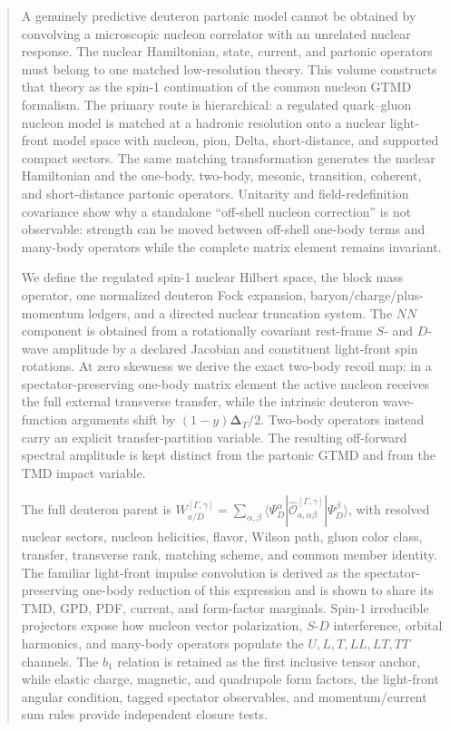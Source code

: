 \documentclass[11pt]{article}
\begin{document}
\begin{abstract}
A genuinely predictive deuteron partonic model cannot be obtained by
convolving a microscopic nucleon correlator with an unrelated nuclear
response.  The nuclear Hamiltonian, state, current, and partonic operators
must belong to one matched low-resolution theory.  This volume constructs
that theory as the spin-1 continuation of the common nucleon GTMD formalism.
The primary route is hierarchical: a regulated quark--gluon nucleon model is
matched at a hadronic resolution onto a nuclear light-front model space with
nucleon, pion, Delta, short-distance, and supported compact sectors.  The same
matching transformation generates the nuclear Hamiltonian and the one-body,
two-body, mesonic, transition, coherent, and short-distance partonic
operators.  Unitarity and field-redefinition covariance show why a standalone
``off-shell nucleon correction'' is not observable: strength can be moved
between off-shell one-body terms and many-body operators while the complete
matrix element remains invariant.

We define the regulated spin-1 nuclear Hilbert space, the block mass operator,
one normalized deuteron Fock expansion, baryon/charge/plus-momentum ledgers,
and a directed nuclear truncation system.  The \(NN\) component is obtained
from a rotationally covariant rest-frame \(S\)- and \(D\)-wave amplitude by a
declared Jacobian and constituent light-front spin rotations.  At zero
skewness we derive the exact two-body recoil map: in a spectator-preserving
one-body matrix element the active nucleon receives the full external
transverse transfer, while the intrinsic deuteron wave-function arguments
shift by \((1-y)\bm\Delta_T/2\).  Two-body operators instead carry an explicit
transfer-partition variable.  The resulting off-forward spectral amplitude
is kept distinct from the partonic GTMD and from the TMD impact variable.

The full deuteron parent is
\(
 W_{a/D}^{[\Gamma,\gamma]}
 =\sum_{\alpha,\beta}
 \langle\Psi_D^\alpha|\widehat{\mathcal O}_{a,\alpha\beta}^{[\Gamma,\gamma]}
 |\Psi_D^\beta\rangle
\),
with resolved nuclear sectors, nucleon helicities, flavor, Wilson path,
gluon color class, transfer, transverse rank, matching scheme, and common
member identity.  The familiar light-front impulse convolution is derived as
the spectator-preserving one-body reduction of this expression and is shown
to share its TMD, GPD, PDF, current, and form-factor marginals.  Spin-1
irreducible projectors expose how nucleon vector polarization, \(S\)-\(D\)
interference, orbital harmonics, and many-body operators populate the
\(U,L,T,LL,LT,TT\) channels.  The \(b_1\) relation is retained as the first
inclusive tensor anchor, while elastic charge, magnetic, and quadrupole form
factors, the light-front angular condition, tagged spectator observables, and
momentum/current sum rules provide independent closure tests.


\end{abstract}
\end{document}
